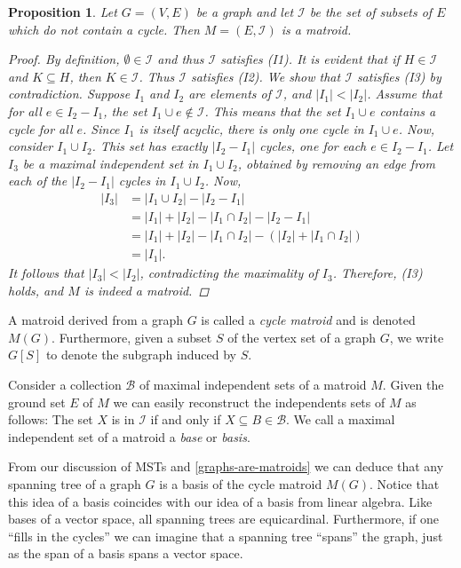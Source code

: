 \documentclass[a4paper,11pt]{report}
\theoremstyle{plain}
\newtheorem{prp}[prp]{Proposition}
\theoremstyle{definition}
\newcommand{\I}{\mathcal{I}}
\newcommand{\B}{\mathscr{B}}
\begin{document}
\begin{prp}\label{graphs-are-matroids}
Let $G = (V,E)$ be a graph and let $\I$ be the set of subsets of $E$ which
do not contain a cycle. Then $M = (E,\I)$ is a matroid.

\begin{proof}
By definition, $\emptyset \in \I$ and thus $\I$ satisfies (I1). It is evident
that if $H \in \I$ and $K \subseteq H$, then $K \in \I$. Thus $\I$ satisfies
(I2). We show that $\I$ satisfies (I3) by contradiction. Suppose $I_1$ and
$I_2$ are elements of $\I$, and $|I_1| < |I_2|$. Assume that for all $e \in
I_2 - I_1$, the set $I_1 \cup e \not\in \I$. This means that the set $I_1
\cup e$ contains a cycle for all $e$. Since $I_1$ is itself acyclic, there
is only one cycle in $I_1 \cup e$. Now, consider $I_1 \cup I_2$. This set has
exactly $|I_2 - I_1|$ cycles, one for each $e \in I_2 - I_1$. Let $I_3$ be a
maximal independent set in $I_1 \cup I_2$, obtained by removing an edge from
each of the $|I_2 - I_1|$ cycles in $I_1 \cup I_2$. Now,
\begin{align*}
    |I_3| &= |I_1 \cup I_2| - |I_2 - I_1|\\
    &= |I_1| + |I_2| - |I_1 \cap I_2| - |I_2 - I_1|\\
    &= |I_1| + |I_2| - |I_1 \cap I_2| - (|I_2| + |I_1 \cap I_2|)\\
    &= |I_1|.
\end{align*}
It follows that $|I_3| < |I_2|$, contradicting the maximality of $I_3$.
Therefore, (I3) holds, and $M$ is indeed a matroid.
\end{proof}
\end{prp}

A matroid derived from a graph $G$ is called a \emph{cycle matroid} and is
denoted $M(G)$. Furthermore, given a subset $S$ of the vertex set of a graph
$G$, we write $G[S]$ to denote the subgraph induced by $S$.

Consider a collection $\B$ of maximal independent sets of a matroid $M$.
Given the ground set $E$ of $M$ we can easily reconstruct the independents
sets of $M$ as follows: The set $X$ is in $\I$ if and only if $X \subseteq
B \in \B$. We call a maximal independent set of a matroid a \emph{base} or
\emph{basis}.

From our discussion of MSTs and \autoref{graphs-are-matroids}
we can deduce that any spanning tree of a graph $G$ is a basis of the cycle
matroid $M(G)$. Notice that this idea of a basis coincides with our idea
of a basis from linear algebra. Like bases of a vector space, all spanning
trees are equicardinal. Furthermore, if one ``fills in the cycles'' we can
imagine that a spanning tree ``spans'' the graph, just as the span of a
basis spans a vector space.
\end{document}
